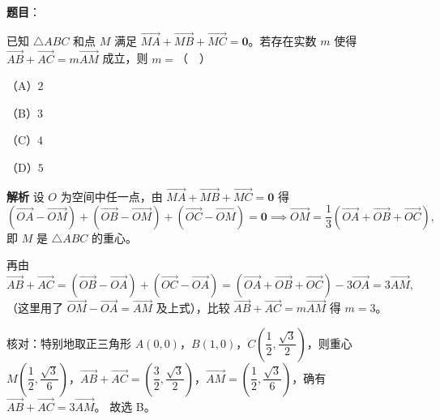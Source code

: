 \begin{answer}

\textbf{题目}：

已知 $\triangle ABC$ 和点 $M$ 满足 $\overrightarrow{MA}+\overrightarrow{MB}+\overrightarrow{MC}=\mathbf 0$。若存在实数 $m$ 使得 $\overrightarrow{AB}+\overrightarrow{AC}=m\overrightarrow{AM}$ 成立，则 $m=$（　）

（A）$2$

（B）$3$

（C）$4$

（D）$5$

\textbf{解析}
设 $O$ 为空间中任一点，由 $\overrightarrow{MA}+\overrightarrow{MB}+\overrightarrow{MC}=\mathbf 0$ 得
\nopagebreak[4]
\[\left(\overrightarrow{OA}-\overrightarrow{OM}\right)+\left(\overrightarrow{OB}-\overrightarrow{OM}\right)+\left(\overrightarrow{OC}-\overrightarrow{OM}\right)=\mathbf 0
\implies \overrightarrow{OM}=\frac13\left(\overrightarrow{OA}+\overrightarrow{OB}+\overrightarrow{OC}\right),\]
即 $M$ 是 $\triangle ABC$ 的重心。

再由
\nopagebreak[4]
\[\overrightarrow{AB}+\overrightarrow{AC}=\left(\overrightarrow{OB}-\overrightarrow{OA}\right)+\left(\overrightarrow{OC}-\overrightarrow{OA}\right)
=\left(\overrightarrow{OA}+\overrightarrow{OB}+\overrightarrow{OC}\right)-3\overrightarrow{OA}=3\overrightarrow{AM},\]
（这里用了 $\overrightarrow{OM}-\overrightarrow{OA}=\overrightarrow{AM}$ 及上式），比较 $\overrightarrow{AB}+\overrightarrow{AC}=m\overrightarrow{AM}$ 得 $m=3$。

核对：特别地取正三角形 $A(0,0)$，$B(1,0)$，$C\left(\dfrac12,\dfrac{\sqrt3}{2}\right)$，则重心 $M\left(\dfrac12,\dfrac{\sqrt3}{6}\right)$，$\overrightarrow{AB}+\overrightarrow{AC}=\left(\dfrac32,\dfrac{\sqrt3}{2}\right)$，$\overrightarrow{AM}=\left(\dfrac12,\dfrac{\sqrt3}{6}\right)$，确有 $\overrightarrow{AB}+\overrightarrow{AC}=3\overrightarrow{AM}$。
故选 B。


\end{answer}
